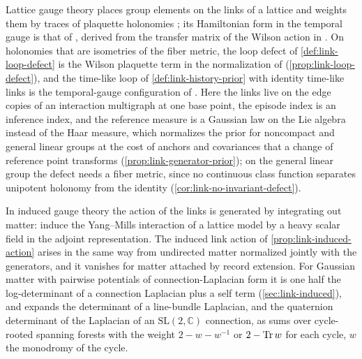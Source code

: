 Lattice gauge theory places group elements on the links of a lattice and weights them by traces of
plaquette holonomies \citep[Eq.~(3.29)]{WilsonConfinement1974}; its Hamiltonian form in the temporal
gauge is that of \citet{KogutSusskind1975}, derived from the transfer matrix of the Wilson action in
\citet[Ch.~15, Eq.~(15.41)]{Creutz1983}. On holonomies that are isometries of the fiber metric, the loop defect of
\cref{def:link-loop-defect} is the Wilson plaquette term in the normalization of
\citet[Ch.~7, Eq.~(7.6)]{Creutz1983} (\cref{prop:link-loop-defect}), and the time-like loop of
\cref{def:link-history-prior} with identity time-like links is the temporal-gauge configuration of
\citet[Ch.~15, Eq.~(15.9)]{Creutz1983}. Here the links live on the edge copies of an interaction
multigraph at one base point, the episode index is an inference index, and the reference measure is a
Gaussian law on the Lie algebra instead of the Haar measure, which normalizes the prior for noncompact and
general linear groups at the cost of anchors and covariances that a change of reference point transforms
(\cref{prop:link-generator-prior}); on the general linear group the defect needs a fiber metric, since no
continuous class function separates unipotent holonomy from the identity
(\cref{cor:link-no-invariant-defect}).

In induced gauge theory the action of the links is generated by integrating out matter:
\citet[Sec.~2, Eqs.~(2)--(4)]{KazakovMigdal1993} induce the Yang--Mills interaction of a lattice model by a
heavy scalar field in the adjoint representation. The induced link action of
\cref{prop:link-induced-action} arises in the same way from undirected matter normalized jointly with the
generators, and it vanishes for matter attached by record extension. For Gaussian matter with pairwise
potentials of connection-Laplacian form it is one half the log-determinant of a connection Laplacian plus
a self term (\cref{sec:link-induced}), and \citet[Theorems~1 and~9]{Kenyon2011VectorBundleLaplacian}
expands the determinant of a line-bundle Laplacian, and the quaternion determinant of the Laplacian of an
$\mathrm{SL}(2,\mathbb C)$ connection, as sums over cycle-rooted spanning forests with the weight
$2-w-w^{-1}$ or $2-\operatorname{Tr} w$ for each cycle, $w$ the monodromy of the cycle.

